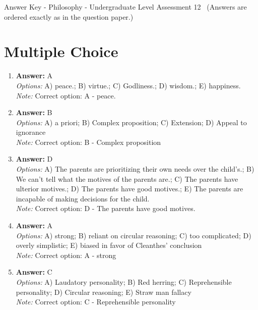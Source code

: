 \documentclass[12pt]{article}
\begin{document}
\begin{center}
Answer Key - Philosophy - Undergraduate Level Assessment 12 \
\small (Answers are ordered exactly as in the question paper.)
\end{center}

\section*{Multiple Choice}
\begin{enumerate}[label=\arabic*.]
\item \textbf{Answer:} A
\\ \textit{Options:} A) peace.; B) virtue.; C) Godliness.; D) wisdom.; E) happiness.
\\ \textit{Note:} Correct option: A - peace.
\item \textbf{Answer:} B
\\ \textit{Options:} A) a priori; B) Complex proposition; C) Extension; D) Appeal to ignorance
\\ \textit{Note:} Correct option: B - Complex proposition
\item \textbf{Answer:} D
\\ \textit{Options:} A) The parents are prioritizing their own needs over the child's.; B) We can't tell what the motives of the parents are.; C) The parents have ulterior motives.; D) The parents have good motives.; E) The parents are incapable of making decisions for the child.
\\ \textit{Note:} Correct option: D - The parents have good motives.
\item \textbf{Answer:} A
\\ \textit{Options:} A) strong; B) reliant on circular reasoning; C) too complicated; D) overly simplistic; E) biased in favor of Cleanthes' conclusion
\\ \textit{Note:} Correct option: A - strong
\item \textbf{Answer:} C
\\ \textit{Options:} A) Laudatory personality; B) Red herring; C) Reprehensible personality; D) Circular reasoning; E) Straw man fallacy
\\ \textit{Note:} Correct option: C - Reprehensible personality
\end{enumerate}
\end{document}
